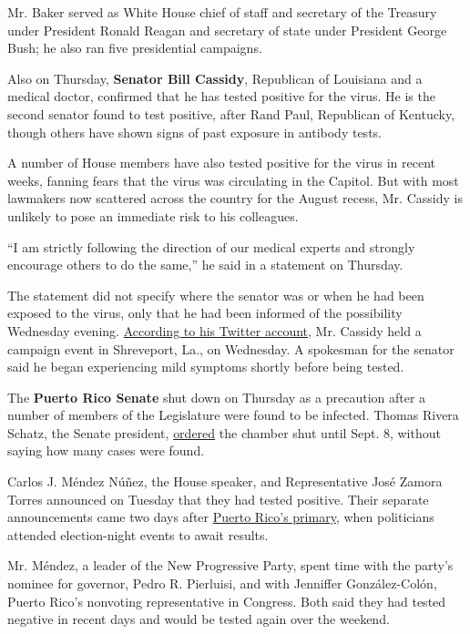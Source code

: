 Mr. Baker served as White House chief of staff and secretary of the
Treasury under President Ronald Reagan and secretary of state under
President George Bush; he also ran five presidential campaigns.

Also on Thursday, \textbf{Senator Bill Cassidy}, Republican of Louisiana
and a medical doctor, confirmed that he has tested positive for the
virus. He is the second senator found to test positive, after Rand Paul,
Republican of Kentucky, though others have shown signs of past exposure
in antibody tests.

A number of House members have also tested positive for the virus in
recent weeks, fanning fears that the virus was circulating in the
Capitol. But with most lawmakers now scattered across the country for
the August recess, Mr. Cassidy is unlikely to pose an immediate risk to
his colleagues.

``I am strictly following the direction of our medical experts and
strongly encourage others to do the same,'' he said in a statement on
Thursday.

The statement did not specify where the senator was or when he had been
exposed to the virus, only that he had been informed of the possibility
Wednesday evening.
\href{https://slack-redir.net/link?url=https\%3A\%2F\%2Ftwitter.com\%2FBillCassidy\%2Fstatus\%2F1296246515736948736}{According
to his Twitter account}, Mr. Cassidy held a campaign event in
Shreveport, La., on Wednesday. A spokesman for the senator said he began
experiencing mild symptoms shortly before being tested.

The \textbf{Puerto Rico Senate} shut down on Thursday as a precaution
after a number of members of the Legislature were found to be infected.
Thomas Rivera Schatz, the Senate president,
\href{https://slack-redir.net/link?url=https\%3A\%2F\%2Fwww.senado.pr.gov\%2FAdministrativeOrders\%2F20-72.pdf}{ordered}
the chamber shut until Sept. 8, without saying how many cases were
found.

Carlos J. Méndez Núñez, the House speaker, and Representative José
Zamora Torres announced on Tuesday that they had tested positive. Their
separate announcements came two days after
\href{https://slack-redir.net/link?url=https\%3A\%2F\%2Fwww.senado.pr.gov\%2FAdministrativeOrders\%2F20-72.pdf}{Puerto
Rico's primary}, when politicians attended election-night events to
await results.

Mr. Méndez, a leader of the New Progressive Party, spent time with the
party's nominee for governor, Pedro R. Pierluisi, and with Jenniffer
González-Colón, Puerto Rico's nonvoting representative in Congress. Both
said they had tested negative in recent days and would be tested again
over the weekend.

